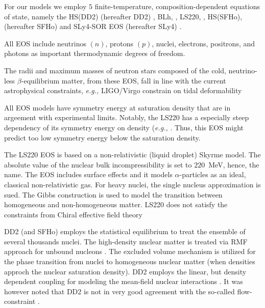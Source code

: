 \documentclass[11pt,a4paper,headinclude=true,DIV=14,BCOR=8mm,chapterprefix,listof=totoc,twoside,openright,abstracton]{scrbook}
\begin{document}
For our models we employ $5$ finite-temperature, composition-dependent equations of state, namely the 
HS(DD2) (hereafter DD2) \cite{Typel:2009sy,Hempel:2009mc}, 
BLh, \cite{Bombaci:2018ksa}, 
LS220, \cite{Lattimer:1991nc}, 
HS(SFHo), (hereafter SFHo) \cite{Steiner:2012rk} and 
SLy4-SOR EOS (hereafter SLy4) \cite{daSilvaSchneider:2017jpg}.

All EOS include neutrinos $(n)$, protons $(p)$, nuclei, electrons, positrons, and photons
as important thermodynamic degrees of freedom.

The radii and maximum masses of neutron stars composed of the cold, neutrino-less $\beta$-equilibrium matter,
from these EOS, fall in line with the current astrophysical constraints, 
\textit{e.g.,} LIGO/Virgo constrain on tidal deformability 
\cite{TheLIGOScientific:2017qsa,Abbott:2018wiz,De:2018uhw,Abbott:2018exr}

All EOS models have symmetry energy at saturation density that are in argeement with experimental limits.
Notably, the LS220 has a especially steep dependency of its symmetry energy on density (\textit{e.g.,} \cite{Lattimer:2012xj,Danielewicz:2013upa}. Thus, this EOS might predict too low symmetry energy below the saturation density. 

The LS220 EOS is based on a non-relativistic (liquid droplet) Skyrme model.
The absolute value of the nuclear bulk incompressibility is set to $220$~MeV, hence, the name.
The EOS includes surface effects and it models $\alpha$-particles as an ideal, classical
non-relativistic gas. For heavy nuclei, the single nucleus approximation is sued. 
The Gibbs construction is used to model the transition between homogeneous and non-homogeneous matter.
LS220 does not satisfy the constraints from Chiral effective field theory \cite{Hempel:2017ikt}

DD2 (and SFHo) employs the statistical equilibrium to treat the ensemble of several thousands nuclei.
The high-density nuclear matter is treated via RMF approach for unbound nucleons \cite{Hempel:2009mc}.
The excluded volume mechanism is utilized for the phase transition from nuclei to homogeneous
nuclear matter (when densities approch the nuclear saturation density).
DD2 employs the linear, but density dependent coupling for modeling the mean-field nuclear interactions \cite{Typel:2009sy}.
It was however noted that DD2 is not in very good agreement with the so-called flow-constraint \cite{Danielewicz:2002pu}.
\end{document}
